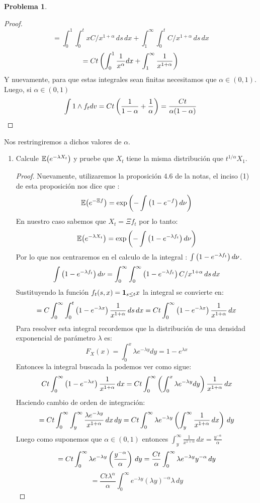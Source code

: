 \documentclass[a5paper,oneside]{amsart}
\theoremstyle{plain}
\theoremstyle{definition}
\newtheorem{problema}{Problema}
\begin{document}
\begin{problema}
\begin{proof}
$$ $$
  $$
 =\int_0^1\int_0^{t}xC/x^{1+\alpha}\, ds\,dx+ \int_1^\infty\int_0^{t}C/x^{1+\alpha}\, ds\,dx
 $$
 $$
 =Ct\left( \int_0^1 \frac{1}{x^{\alpha}}dx+\int_1^{\infty}\frac{1}{x^{1+\alpha}}\right) 
 $$
 Y nuevamente, para que estas integrales sean finitas necesitamos que $\alpha \in (0,1)$.  Luego, si $\alpha \in (0,1)$ 
 $$
  \int 1 \wedge f_t dv =Ct\left( \frac{1}{1-\alpha}+\frac{1}{\alpha}\right) =\frac{Ct}{\alpha(1-\alpha)}
 $$
 \end{proof}
 Nos restringiremos a dichos valores de $\alpha$. 
 \begin{enumerate}
 \item Calcule $\mathbb{E}\! \left( e^{-\lambda X_t} \right)$ y pruebe que $X_{t}$ tiene la misma distribuci\'on que $t^{1/\alpha}X_1$. 
 \begin{proof}
 Nuevamente, utilizaremos la proposici\'on 4.6 de la notas, el inciso (1) de esta proposici\'on  nos dice que :
 $$
 \mathbb{E}\! \left( e^{-\Xi f} \right)=\exp\left( -\int\left( 1-e^{-f}\right) d\nu\right) 
$$
 En nuestro caso sabemos que $X_t=\Xi f_t$ por lo tanto:
 $$
  \mathbb{E}\! \left( e^{-\lambda X_t} \right)=\exp\left( -\int\left( 1-e^{-\lambda f_t}\right) d\nu\right) 
 $$
 Por lo que nos centraremos en el calculo de la integral : $\int\left( 1-e^{-\lambda f_t}\right) d\nu$.
 $$
 \int\left( 1-e^{-\lambda f_t}\right) d\nu=\int_0^{\infty}\int_0^{\infty} \left( 1-e^{-\lambda f_t}\right) C/x^{1+\alpha}\, ds\,dx
 $$
 Sustituyendo la funci\'on $f_t\!\left( s,x\right) ={\bf{1}}_{s\leq t}x$ la integral se convierte en:
 $$
 =C\int_0^{\infty}\int_0^{t} \left( 1-e^{-\lambda x}\right) \frac{1}{x^{1+\alpha}}\, ds\,dx=Ct\int_0^{\infty} \left( 1-e^{-\lambda x}\right) \frac{1}{x^{1+\alpha}}\,dx
 $$
Para resolver esta integral recordemos que la distribuci\'on de una densidad exponencial de par\'ametro $\lambda$ es:
$$
F_X(x)=\int_0^{x}\lambda e^{-\lambda y}dy=1-e^{\lambda x}
$$
Entonces la integral buscada la podemos ver como sigue:
$$
Ct\int_0^{\infty} \left( 1-e^{-\lambda x}\right) \frac{1}{x^{1+\alpha}}\,dx=Ct\int_0^{\infty} \left( \int_0^{x}\lambda e^{-\lambda y}dy\right) \frac{1}{x^{1+\alpha}}\,dx
$$
Haciendo cambio de orden de integraci\'on:
$$
=Ct\int_0^{\infty} \int_y^{\infty}\frac{\lambda e^{-\lambda y}}{x^{1+\alpha}}\,dx \,dy=Ct\int_0^{\infty} \lambda e^{-\lambda y} \left( \int_y^{\infty}\frac{1}{x^{1+\alpha}}\,dx \right) \,dy
 $$
 Luego como suponemos que $\alpha \in (0,1)$ entonces $\int_y^{\infty}\frac{1}{x^{1+\alpha}}\,dx =\frac{y^{-\alpha}}{\alpha}$
 $$
=Ct\int_0^{\infty} \lambda e^{-\lambda y} \left( \frac{y^{-\alpha}}{\alpha}\right) \,dy=\frac{Ct}{\alpha}\int_0^{\infty} \lambda e^{-\lambda y} y^{-\alpha}\,dy
 $$
 $$
 =\frac{Ct\lambda^{\alpha}}{\alpha}\int_0^{\infty}  e^{-\lambda y}(\lambda y)^{-\alpha} \lambda \,dy
$$
\end{proof}
\end{enumerate}
\end{problema}
\end{document}
